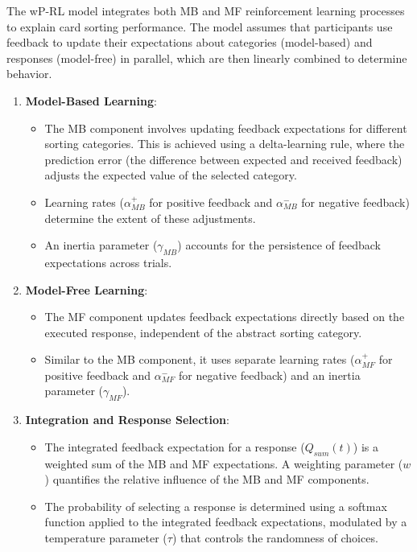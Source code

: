 \documentclass[
  man]{apa6}
\providecommand{\tightlist}{%
  \setlength{\itemsep}{0pt}\setlength{\parskip}{0pt}}
\begin{document}
The wP-RL model integrates both MB and MF reinforcement learning processes to explain card sorting performance. The model assumes that participants use feedback to update their expectations about categories (model-based) and responses (model-free) in parallel, which are then linearly combined to determine behavior.

\begin{enumerate}
\def\labelenumi{\arabic{enumi}.}
\tightlist
\item
  \textbf{Model-Based Learning}:

  \begin{itemize}
  \tightlist
  \item
    The MB component involves updating feedback expectations for different sorting categories. This is achieved using a delta-learning rule, where the prediction error (the difference between expected and received feedback) adjusts the expected value of the selected category.
  \item
    Learning rates (\(\alpha^+_{MB}\) for positive feedback and \(\alpha^-_{MB}\) for negative feedback) determine the extent of these adjustments.
  \item
    An inertia parameter (\(\gamma_{MB}\)) accounts for the persistence of feedback expectations across trials.
  \end{itemize}
\item
  \textbf{Model-Free Learning}:

  \begin{itemize}
  \tightlist
  \item
    The MF component updates feedback expectations directly based on the executed response, independent of the abstract sorting category.
  \item
    Similar to the MB component, it uses separate learning rates (\(\alpha^+_{MF}\) for positive feedback and \(\alpha^-_{MF}\) for negative feedback) and an inertia parameter (\(\gamma_{MF}\)).
  \end{itemize}
\item
  \textbf{Integration and Response Selection}:

  \begin{itemize}
  \tightlist
  \item
    The integrated feedback expectation for a response (\(Q_{sum}(t)\)) is a weighted sum of the MB and MF expectations. A weighting parameter (\(w\)) quantifies the relative influence of the MB and MF components.
  \item
    The probability of selecting a response is determined using a softmax function applied to the integrated feedback expectations, modulated by a temperature parameter (\(\tau\)) that controls the randomness of choices.
  \end{itemize}
\end{enumerate}
\end{document}

